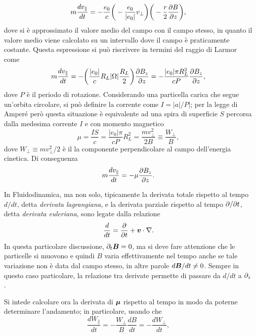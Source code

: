 \begin{equation}
    m\frac{dv_\parallel}{dt} = -\frac{e_0}{c}\bigg(-\frac{e_0}{|e_0|}v_\perp\bigg)\bigg(-\frac{r}{2}\frac{\partial B}{\partial z}\bigg),
\end{equation}
dove si è approssimato il valore medio del campo con il campo stesso, in quanto il valore medio viene calcolato su un intervallo dove il campo è praticamente costante. Questa espressione si può riscrivere in termini del raggio di Larmor come 
\begin{equation}
    m\frac{dv_\parallel}{dt} = -\bigg(\frac{|e_0|}{c}R_L|\Omega|\frac{R_L}{2}\bigg)\frac{\partial B_z}{\partial z} = -\frac{|e_0|\pi R_L^2}{cP}\frac{\partial B_z}{\partial z},
\end{equation}
dove $P$ è il periodo di rotazione. Considerando una particella carica che segue un'orbita circolare, si può definire la corrente come $I =|a|/P|$; per la legge di Amperé però questa situazione è equivalente ad una spira di superficie $S$ percorsa dalla medesima corrente $I$ e con momento magnetico
\begin{equation}
    \mu = \frac{IS}{c} = \frac{|e_0|\pi}{cP}R_L^2 = \frac{mv_\perp^2}{2B} \equiv \frac{W_\perp}{B},
\end{equation}
dove $W_\perp \equiv mv_\perp^2/2$ è il la componente perpendicolare al campo dell'energia cinetica. Di conseguenza 
\begin{equation}
    m\frac{dv_\parallel}{dt} = -\mu\frac{\partial B_z}{\partial z}.
\end{equation}
\begin{obs}
    In Fluidodinamica, ma non solo, tipicamente la derivata totale rispetto al tempo $d/dt$, detta \emph{derivata lagrangiana}, e la derivata parziale rispetto al tempo $\partial/\partial t$, detta \emph{derivata euleriana}, sono legate dalla relazione
    \begin{equation}
        \frac{d}{dt} = \frac{\partial}{\partial t} + \bm{v} \cdot \nabla.
    \end{equation}
    In questa particolare discussione, $\partial_t\bm{B} = 0$, ma si deve fare attenzione che le particelle si muovono e quindi $B$ varia effettivamente nel tempo anche se tale variazione non è data dal campo stesso, in altre parole $d\bm{B}/dt \neq 0$. Sempre in questo caso particolare, la relazione tra derivate permette di passare da $d/dt$ a $\partial_z$.
\end{obs}
Si intede calcolare ora la derivata di $\bm{\mu}$ rispetto al tempo in modo da poterne determinare l'andamento; in particolare, usando che 
\begin{equation}
    \frac{dW_\parallel}{dt} = -\frac{W_\perp}{B}\frac{dB}{dt} = -\frac{dW_\perp}{dt},
\end{equation}

